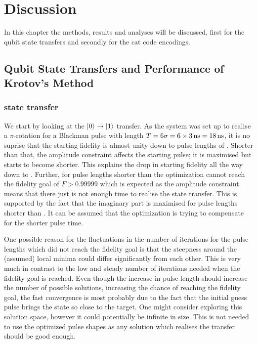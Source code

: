 \documentclass[main.tex]{subfiles}
\begin{document}
\chapter{Discussion}
In this chapter the methods, results and analyses will be discussed, first for the qubit state transfers and secondly for the cat code encodings.

\section{Qubit State Transfers and Performance of Krotov's Method}
\subsection{%
	\texorpdfstring{}{0 -> 1} state transfer
}
We start by looking at the \(\ket{0}\rightarrow\ket{1}\) transfer.
As the system was set up to realise a \(\pi\)-rotation for a Blackman pulse with length \(T=6\sigma = 6\times\SI{3}{\nano\second} = \SI{18}{\nano\second}\), it is no suprise that the starting fidelity is almost unity down to pulse lengths of .
Shorter than that, the amplitude constraint affects the starting pulse; it is maximised but starts to become shorter.
This explains the drop in starting fidelity all the way down to .
Further, for pulse lengths shorter than  the optimization cannot reach the fidelity goal of \(F > 0.99999\) which is expected as the amplitude constraint means that there just is not enough time to realise the state transfer.
This is supported by the fact that the imaginary part is maximised for pulse lengths shorter than .
It can be assumed that the optimization is trying to compensate for the shorter pulse time.

One possible reason for the fluctuations in the number of iterations for the pulse lengths which did not reach the fidelity goal is that the steepness around the (assumed) local minima could differ significantly from each other.
This is very much in contrast to the low and steady number of iterations needed when the fidelity goal is reached.
Even though the increase in pulse length should increase the number of possible solutions, increasing the chance of reaching the fidelity goal, the fast convergence is most probably due to the fact that the initial guess pulse brings the state so close to the target.
One might consider exploring this solution space, however it could potentially be infinite in size.
This is not needed to use the optimized pulse shapes as any solution which realises the transfer should be good enough.
\end{document}
